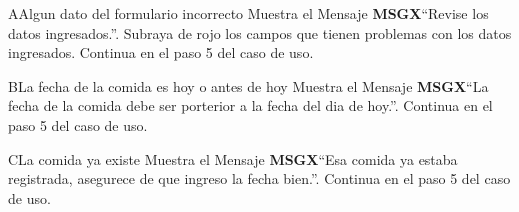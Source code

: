 		\begin{UCtrayectoriaA}{A}{Algun dato del formulario incorrecto}
			\UCpaso Muestra el Mensaje {\bf MSGX}``Revise los datos ingresados.''.
                \UCpaso Subraya de rojo los campos que tienen problemas con los datos ingresados.
			\UCpaso Continua en el paso 5 del caso de uso.
		\end{UCtrayectoriaA}


            \begin{UCtrayectoriaA}{B}{La fecha de la comida es hoy o antes de hoy}
			\UCpaso Muestra el Mensaje {\bf MSGX}``La fecha de la comida debe ser porterior a la fecha del dia de hoy.''.
			\UCpaso Continua en el paso 5 del caso de uso.
		\end{UCtrayectoriaA}
		
		\begin{UCtrayectoriaA}{C}{La comida ya existe}
			\UCpaso Muestra el Mensaje {\bf MSGX}``Esa comida ya estaba registrada, asegurece de que ingreso la fecha bien.''.
			\UCpaso Continua en el paso 5 del caso de uso.
		\end{UCtrayectoriaA}

